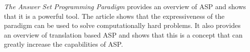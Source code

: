 \documentclass[runningheads]{llncs}
\newcommand{\papertitle}{The Answer Set Programming Paradigm}
\begin{document}
\textit{\papertitle} provides an overview of ASP and shows that it is a powerful tool. The article shows that the expressiveness of the paradigm can be used to solve computationally hard problems. It also provides an overview of translation based ASP and shows that this is a concept that can greatly increase the capabilities of ASP. 




\begin{comment}

shows that ASP is a powerful tool 
recursion 
default values 
computationally hard problems
ASP can be used with translation approaches in order to make it solvable with different solvers
Highlight the advantages of ASP over other paradigms and languages


Isolate/translate the constraints that are not calculatable with ASP solver and pass to different solver. Use two or more solvers to solve in cooperation to solve overall problem. 

(1) Ground program into a format that is solvable by different solvers. 

(3) Translate it into an intermediate representation (SAP modulo acyclicity). 


Because ASP can express constraints that are not solvable using ASP solvers.

(1) Because we can now combine an expressive paradigm like ASP with already available solvers, which makes for a powerful combination. 

(3)This would make interoperability of languages and solvers easier, since they have a common interface. 



\begin{itemize}
    \item If there are problems which can not be solved by an ASP solver, we treat the corresponding rules differently and have them solved by a separate solver.
    \item tranlation-based ASP: We translate an ASP program into different logic, so that it should be solved using a different solver
    \item It is work done to propose an intermediate representation of different logical languages. This could then be passed to the actual solver. This would ease the interoperability of different logical languages/solvers
\end{itemize}



\end{comment}
\end{document}
